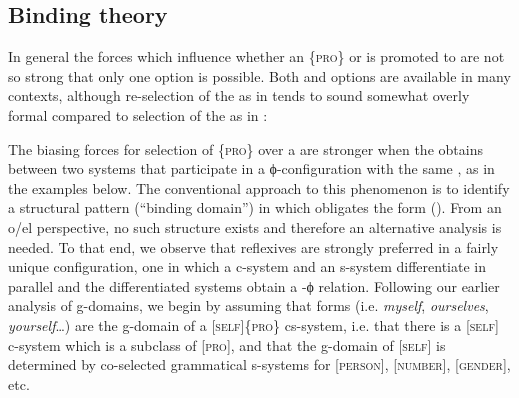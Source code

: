 \subsection{Binding theory}

In general the forces which influence whether an  \{\textsc{pro}\} or  is promoted to  are not so strong that only one option is possible. Both  and  options are available in many contexts, although re-selection of the  as in  tends to sound somewhat overly formal compared to selection of the  as in :

\ea\label{ex:7:13}
   \label{ex:7:13a}
    \label{ex:7:13b}
\z
\z

  The biasing forces for selection of \{\textsc{pro}\} over a  are stronger when the  obtains between two systems that participate in a ϕ-configuration with the same , as in the examples below. The conventional approach to this phenomenon is to identify a structural pattern (“binding domain”) in which  obligates the  form (\citealt{Chomsky1982,Chomsky1993,Haegeman1994,Reinhart1976,Safir2004}). From an o/el perspective, no such structure exists and therefore an alternative analysis is needed. To that end, we observe that reflexives are strongly preferred in a fairly unique configuration, one in which a c-system and an s-system differentiate in parallel and the differentiated systems obtain a -ϕ relation. Following our earlier analysis of  g-domains, we begin by assuming that  forms (i.e. \textit{myself}, \textit{ourselves}, \textit{yourself}…) are the g-domain of a [\textsc{self}]\{\textsc{pro}\} cs-system, i.e. that there is a [\textsc{self}] c-system which is a subclass of [\textsc{pro}], and that the g-domain of [\textsc{self}] is determined by co-selected grammatical s-systems for [\textsc{person}], [\textsc{number}], [\textsc{gender}], etc. 

\ea\label{ex:7:14}
 \label{ex:7:14a}     
 \label{ex:7:14b}       
\z
\z

